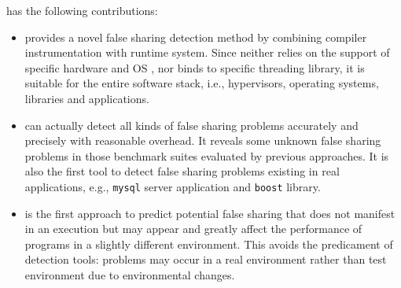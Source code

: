 \Defaults{} has the following contributions:
\begin{itemize}
\item
{} provides a novel false sharing detection method by
combining compiler instrumentation with runtime system.
Since  neither relies on the support of specific hardware and OS ,
nor binds to specific threading library, 
it is suitable for the entire software stack, 
i.e., hypervisors, operating systems, libraries and applications. 

\item
{} can actually detect all kinds of false sharing problems accurately and precisely 
with reasonable overhead. 
It reveals some unknown false sharing problems in those benchmark suites evaluated by 
previous approaches.
It is also the first tool to detect false sharing problems existing in real applications, e.g.,
\texttt{mysql} server application and \texttt{boost} library.

\item
{} is the first approach to predict potential false sharing that does
not manifest in an execution but may appear and greatly affect the performance of programs 
in a slightly different environment. 
This avoids the predicament of detection tools: problems may occur in a real
environment rather than test environment due to environmental changes. 


\end{itemize}


